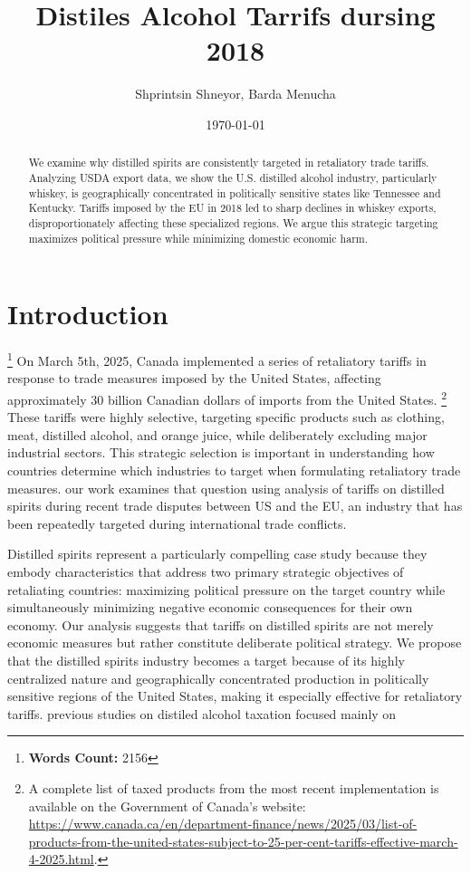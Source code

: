 \documentclass[AEJ]{AEA}
\begin{document}
	
	\title{Distiles Alcohol Tarrifs dursing 2018}
		\author{Shprintsin Shneyor, Barda Menucha}
	\date{\today}
	
	\JEL{}
	
	
	\begin{abstract}
		We examine why distilled spirits are consistently targeted in retaliatory trade tariffs. Analyzing USDA export data, we show the U.S. distilled alcohol industry, particularly whiskey, is geographically concentrated in politically sensitive states like Tennessee and Kentucky.  Tariffs imposed by the EU in 2018 led to sharp declines in whiskey exports, disproportionately affecting these specialized regions. We argue this strategic targeting maximizes political pressure while minimizing domestic economic harm.

	\end{abstract}
	
	\maketitle
	
	\section{Introduction}

\footnote{\textbf{Words Count:} 2156}
On March 5th, 2025, Canada implemented a series of retaliatory tariffs in response to trade measures imposed by the United States, affecting approximately 30 billion Canadian dollars of imports from the United States.
\footnote{A complete list of taxed products from the most recent implementation is available on the Government of Canada’s website:
\url{https://www.canada.ca/en/department-finance/news/2025/03/list-of-products-from-the-united-states-subject-to-25-per-cent-tariffs-effective-march-4-2025.html}.} 
These tariffs were highly selective, targeting specific products such as clothing, meat, distilled alcohol, and orange juice, while deliberately excluding major industrial sectors. This strategic selection is important in understanding how countries determine which industries to target when formulating retaliatory trade measures. our work examines that question using analysis of tariffs on distilled spirits during recent trade disputes between US and the EU, an industry that has been repeatedly targeted during international trade conflicts.
	
	Distilled spirits represent a particularly compelling case study because they embody characteristics that address two primary strategic objectives of retaliating countries: maximizing political pressure on the target country while simultaneously minimizing negative economic consequences for their own economy. Our analysis suggests that tariffs on distilled spirits are not merely economic measures but rather constitute deliberate political strategy. We propose that the distilled spirits industry becomes a target because of its highly centralized nature and geographically concentrated production in politically sensitive regions of the United States, making it especially effective for retaliatory tariffs.
	previous studies on distiled alcohol taxation focused mainly on 
	
\end{document}
